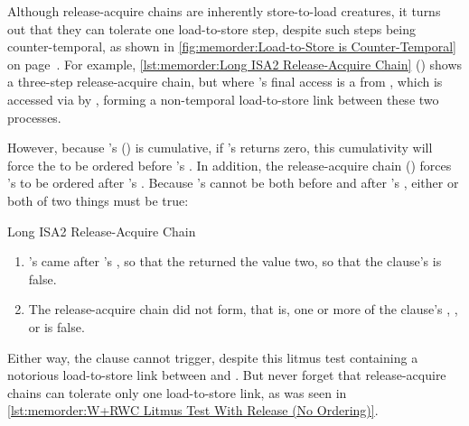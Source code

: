Although release-acquire chains are inherently store-to-load creatures,
it turns out that they can tolerate one load-to-store step, despite
such steps being counter-temporal, as shown in
\cref{fig:memorder:Load-to-Store is Counter-Temporal}
on
page~\pageref{fig:memorder:Load-to-Store is Counter-Temporal}.
For example,
\cref{lst:memorder:Long ISA2 Release-Acquire Chain}
()
shows a three-step release-acquire chain, but where 's
final access is a  from , which is
accessed via  by , forming a non-temporal
load-to-store link between these two processes.
\begin{fcvref}
However, because 's  ()
is cumulative, if 's  returns zero,
this cumulativity will force the  to be ordered
before 's .
In addition, the release-acquire chain
()
forces 's  to be ordered after 's
.
Because 's  cannot be both before and after
's , either or both of two things must
be true:
\end{fcvref}

\begin{listing}

\caption{Long ISA2 Release-Acquire Chain}
\label{lst:memorder:Long ISA2 Release-Acquire Chain}
\end{listing}

\begin{enumerate}
\item	{}'s  came after 's
	, so that the  returned
	the value two, so that the  clause's 
	is false.
\item	The release-acquire chain did not form, that is, one or more
	of the  clause's , , or 
	is false.
\end{enumerate}

Either way, the  clause cannot trigger, despite this litmus
test containing a notorious load-to-store link between
 and .
But never forget that release-acquire chains can tolerate only one
load-to-store link, as was seen in
\cref{lst:memorder:W+RWC Litmus Test With Release (No Ordering)}.

